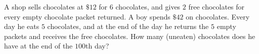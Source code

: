 A shop sells chocolates at $\$12$ for $6$ chocolates, and gives $2$ free chocolates for every empty chocolate packet returned. A boy spends $\$42$ on chocolates. Every day he eats $5$ chocolates, and at the end of the day he returns the $5$ empty packets and receives the free chocolates. How many (uneaten) chocolates does he have at the end of the $100$th day?
